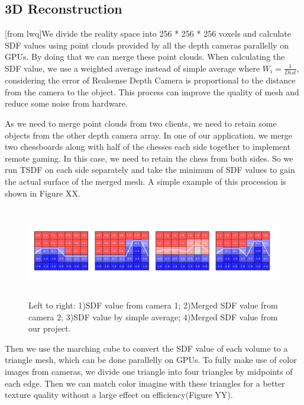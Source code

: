 \subsection{3D Reconstruction}

[from lwq]We divide the reality space into 256 * 256 * 256 voxels and calculate SDF values using point clouds provided by all the depth cameras parallelly on GPUs. By doing that we can merge these point clouds. When calculating the SDF value, we use a weighted average instead of simple average where  $W_{i} = \frac{1}{Dist}$, considering the error of Realsense Depth Camera is proportional to the distance from the camera to the object. This process can improve the quality of mesh and reduce some noise from hardware. 
    
As we need to merge point clouds from two clients, we need to retain some objects from the other depth camera array. In one of our application, we merge two chessboards along with half of the chesses each side together to implement remote gaming. In this case, we need to retain the chess from both sides. So we run TSDF on each side separately and take the minimum of SDF values to gain the actual surface of the merged mesh. A simple example of this procession is shown in Figure XX.

\begin{figure}[!htbp]
\centering
\includegraphics[width=14cm,height=4cm]{figures/figure_tsdf.png}
\setlength{\abovecaptionskip}{-0.5cm}
\caption{Left to right: 1)SDF value from camera 1; 2)Merged SDF value from camera 2; 3)SDF value by simple average; 4)Merged SDF value from our project.}
\label{3}
\end{figure}
    
Then we use the marching cube to convert the SDF value of each volume to a triangle mesh, which can be done parallelly on GPUs. To fully make use of color images from cameras, we divide one triangle into four triangles by midpoints of each edge. Then we can match color imagine with these triangles for a better texture quality without a large effect on efficiency(Figure YY).


